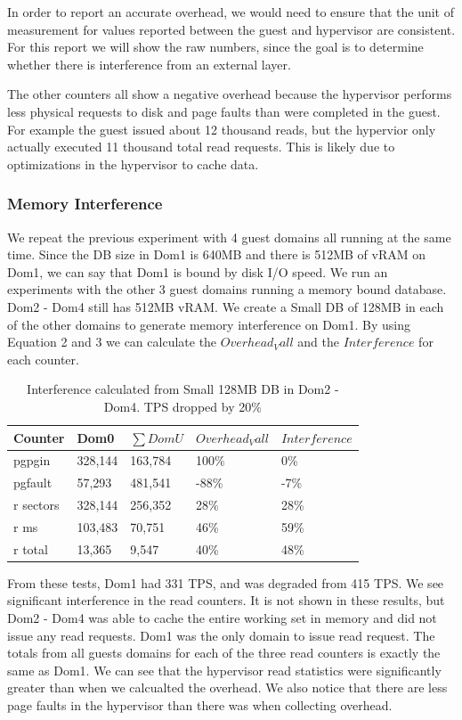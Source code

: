 In order to report an accurate overhead, we would need to ensure that the unit of measurement for values reported between the guest and hypervisor are consistent.  For this report we will show the raw numbers, since the goal is to determine whether there is interference from an external layer. 

The other counters all show a negative overhead because the hypervisor performs less physical requests to disk and page faults than were completed in the guest.  For example the guest issued about 12 thousand reads, but the hypervior only actually executed 11 thousand total read requests.  This is likely due to optimizations in the hypervisor to cache data.

\subsubsection{Memory Interference}
We repeat the previous experiment with 4 guest domains all running at the same time.
Since the DB size in Dom1 is 640MB and there is 512MB of vRAM on Dom1, we can say that Dom1 is bound by disk I/O speed.
We run an experiments with the other 3 guest domains running a memory bound database.  Dom2 - Dom4 still has 512MB vRAM.  
We create a Small DB of 128MB in each of the other domains to generate memory interference on Dom1.
By using Equation 2 and 3 we can calculate the $Overhead_Vall$ and the $Interference$ for each counter.

\begin{table}[h]
\begin{tabular}{ l l l l p{5cm} }
  Counter & Dom0 & $\sum{DomU}$ & $Overhead_Vall$ & $Interference$ \\
  \hline
	pgpgin    & 328,144 & 163,784 & 100\% &   0\% \\
	pgfault   &  57,293 & 481,541 & -88\% &  -7\% \\
	r sectors & 328,144 & 256,352 &  28\% &  28\% \\
	r ms      & 103,483 &  70,751 &  46\% &  59\% \\
	r total   &  13,365 &   9,547 &  40\% &  48\% \\
  \hline
\end{tabular}
\caption{Interference calculated from Small 128MB DB in Dom2 - Dom4.  TPS dropped by 20\%} 
\label{fig:InterferenceSm}
\end{table}

From these tests, Dom1 had 331 TPS, and was degraded from 415 TPS.  We see significant interference in the read counters.  It is not shown in these results, but Dom2 - Dom4 was able to cache the entire working set in memory and did not issue any read requests.  Dom1 was the only domain to issue read request. The totals from all guests domains for each of the three read counters is exactly the same as Dom1.  We can see that the hypervisor read statistics were significantly greater than when we calcualted the overhead.  We also notice that there are less page faults in the hypervisor than there was when collecting overhead.

